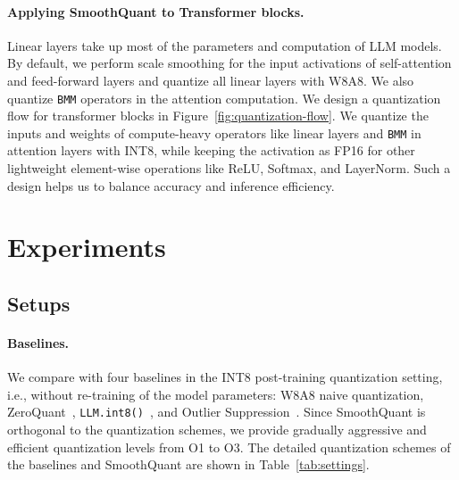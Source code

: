 \paragraph{Applying SmoothQuant to Transformer blocks. } Linear layers take up most of the parameters and computation of LLM models. By default, we perform scale smoothing for the input activations of self-attention and feed-forward layers and quantize all linear layers with W8A8. We also quantize \texttt{BMM} operators in the attention computation. We design a quantization flow for transformer blocks in Figure~\ref{fig:quantization-flow}. We quantize the inputs and weights of compute-heavy operators like linear layers and \texttt{BMM} in attention layers with INT8, while keeping the activation as FP16 for other lightweight element-wise operations like ReLU, Softmax, and LayerNorm. Such a design helps us to balance accuracy and inference efficiency.

\section{Experiments}
\subsection{Setups}
\paragraph{Baselines.}

We compare with four baselines in the INT8 post-training quantization setting, i.e., without re-training of the model parameters: W8A8 naive quantization, ZeroQuant~\cite{zeroquant},  \texttt{LLM.int8()}~\cite{dettmers2022llmint8}, and Outlier Suppression~\cite{outlier_suppression}. Since SmoothQuant is orthogonal to the quantization schemes, we provide gradually aggressive and efficient quantization levels from O1 to O3. The detailed quantization schemes of the baselines and SmoothQuant are shown in Table~\ref{tab:settings}.

\renewcommand \arraystretch{0.93}

\newcommand{\hidegray}[1]{{{#1}}}
\renewcommand \arraystretch{0.95}

